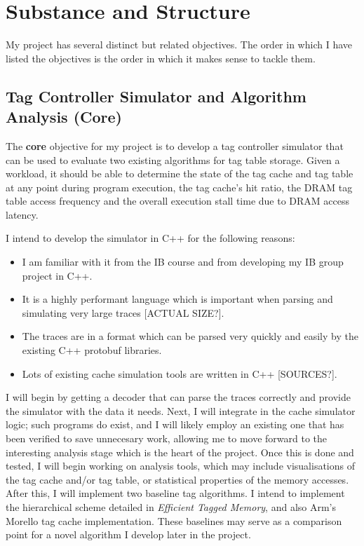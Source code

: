 \documentclass[10pt,a4paper]{article}
\begin{document}
\section*{Substance and Structure}
My project has several distinct but related objectives. The order in which I have listed the objectives is the order in which it makes sense to tackle them.
\subsection*{Tag Controller Simulator and Algorithm Analysis (Core)}
The \textbf{core} objective for my project is to develop a tag controller simulator that can be used to evaluate two existing algorithms for tag table storage. Given a workload, it should be able to determine the state of the tag cache and tag table at any point during program execution, the tag cache's hit ratio, the DRAM tag table access frequency and the overall execution stall time due to DRAM access latency.

I intend to develop the simulator in C++ for the following reasons:
\begin{itemize}
	\item I am familiar with it from the IB course and from developing my IB group project in C++.
	\item It is a highly performant language which is important when parsing and simulating very large traces [ACTUAL SIZE?].
	\item The traces are in a format which can be parsed very quickly and easily by the existing C++ protobuf libraries.
	\item Lots of existing cache simulation tools are written in C++ [SOURCES?].
\end{itemize}

I will begin by getting a decoder that can parse the traces correctly and provide the simulator with the data it needs. Next, I will integrate in the cache simulator logic; such programs do exist, and I will likely employ an existing one that has been verified to save unnecesary work, allowing me to move forward to the interesting analysis stage which is the heart of the project. Once this is done and tested, I will begin working on analysis tools, which may include visualisations of the tag cache and/or tag table, or statistical properties of the memory accesses. After this, I will implement two baseline tag algorithms. I intend to implement the hierarchical scheme detailed in \textit{Efficient Tagged Memory}, and also Arm's Morello tag cache implementation. These baselines may serve as a comparison point for a novel algorithm I develop later in the project.
\end{document}
